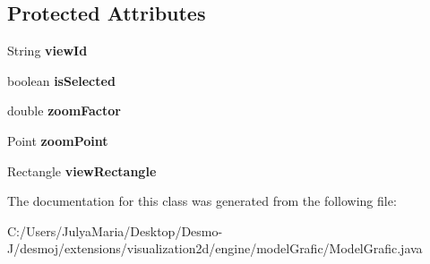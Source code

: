 \subsection*{Protected Attributes}
\begin{DoxyCompactItemize}
\item 
String {\bfseries view\-Id}\label{classdesmoj_1_1extensions_1_1visualization2d_1_1engine_1_1model_grafic_1_1_model_grafic_1_1_zoom_entry_a581de968643e47aadf0f8f4a821728b1}

\item 
boolean {\bfseries is\-Selected}\label{classdesmoj_1_1extensions_1_1visualization2d_1_1engine_1_1model_grafic_1_1_model_grafic_1_1_zoom_entry_aa5ff0a04aee3d81748913cf08126ba19}

\item 
double {\bfseries zoom\-Factor}\label{classdesmoj_1_1extensions_1_1visualization2d_1_1engine_1_1model_grafic_1_1_model_grafic_1_1_zoom_entry_a9cee9aeaf403d4accec2e5bcbc36bc03}

\item 
Point {\bfseries zoom\-Point}\label{classdesmoj_1_1extensions_1_1visualization2d_1_1engine_1_1model_grafic_1_1_model_grafic_1_1_zoom_entry_a05d87a14729090d3f983222149971861}

\item 
Rectangle {\bfseries view\-Rectangle}\label{classdesmoj_1_1extensions_1_1visualization2d_1_1engine_1_1model_grafic_1_1_model_grafic_1_1_zoom_entry_a9fb3e044fd950f7a3269df90625bdb23}

\end{DoxyCompactItemize}


The documentation for this class was generated from the following file\-:\begin{DoxyCompactItemize}
\item 
C\-:/\-Users/\-Julya\-Maria/\-Desktop/\-Desmo-\/\-J/desmoj/extensions/visualization2d/engine/model\-Grafic/Model\-Grafic.\-java\end{DoxyCompactItemize}
